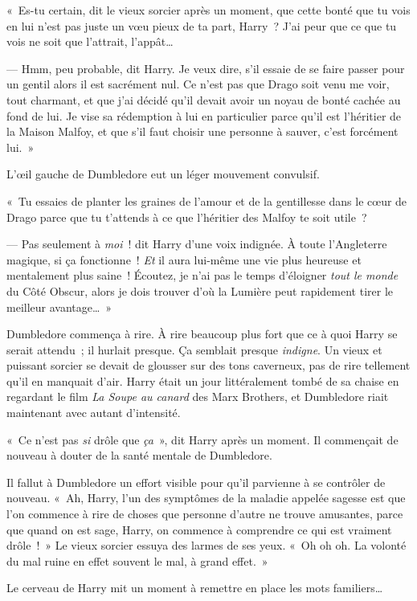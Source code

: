 «~Es-tu certain, dit le vieux sorcier après un moment, que cette bonté que tu vois en lui n'est pas juste un vœu pieux de ta part, Harry~? J'ai peur que ce que tu vois ne soit que l'attrait, l'appât…

--- Hmm, peu probable, dit Harry. Je veux dire, s'il essaie de se faire passer pour un gentil alors il est sacrément nul. Ce n'est pas que Drago soit venu me voir, tout charmant, et que j'ai décidé qu'il devait avoir un noyau de bonté cachée au fond de lui. Je vise sa rédemption à lui en particulier parce qu'il est l'héritier de la Maison Malfoy, et que s'il faut choisir une personne à sauver, c'est forcément lui.~»

L'œil gauche de Dumbledore eut un léger mouvement convulsif.

«~Tu essaies de planter les graines de l'amour et de la gentillesse dans le cœur de Drago parce que tu t'attends à ce que l'héritier des Malfoy te soit utile~?

--- Pas seulement à \emph{moi}~! dit Harry d'une voix indignée. À toute l'Angleterre magique, si ça fonctionne~! \emph{Et} il aura lui-même une vie plus heureuse et mentalement plus saine~! Écoutez, je n'ai pas le temps d'éloigner \emph{tout le monde} du Côté Obscur, alors je dois trouver d'où la Lumière peut rapidement tirer le meilleur avantage…~»

Dumbledore commença à rire. À rire beaucoup plus fort que ce à quoi Harry se serait attendu~; il hurlait presque. Ça semblait presque \emph{indigne}. Un vieux et puissant sorcier se devait de glousser sur des tons caverneux, pas de rire tellement qu'il en manquait d'air. Harry était un jour littéralement tombé de sa chaise en regardant le film \emph{La Soupe au canard} des Marx Brothers, et Dumbledore riait maintenant avec autant d'intensité.

«~Ce n'est pas \emph{si} drôle que \emph{ça}~», dit Harry après un moment. Il commençait de nouveau à douter de la santé mentale de Dumbledore.

Il fallut à Dumbledore un effort visible pour qu'il parvienne à se contrôler de nouveau. «~Ah, Harry, l'un des symptômes de la maladie appelée sagesse est que l'on commence à rire de choses que personne d'autre ne trouve amusantes, parce que quand on est sage, Harry, on commence à comprendre ce qui est vraiment drôle~!~» Le vieux sorcier essuya des larmes de ses yeux. «~Oh oh oh. La volonté du mal ruine en effet souvent le mal, à grand effet.~»

Le cerveau de Harry mit un moment à remettre en place les mots familiers…


